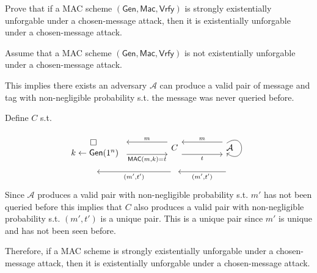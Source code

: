\documentclass[12pt, letterpaper]{article}
\newcommand{\skcgen}{{\sf Gen}}
\begin{document}
\begin{problem}{}
    Prove that if a MAC scheme $(\mathsf{Gen}, \mathsf{Mac}, \mathsf{Vrfy})$ is strongly existentially unforgable under a chosen-message attack, then it is existentially unforgable under a chosen-message attack.
\end{problem}
\begin{problemproof}
    Assume that a MAC scheme $(\mathsf{Gen}, \mathsf{Mac}, \mathsf{Vrfy})$ is not existentially unforgable under a chosen-message attack.

    This implies there exists an adversary $\mathcal{A}$ can produce a valid pair of message and tag with non-negligible probability s.t. the message was never queried before.

    Define $C$ s.t.
    \[\begin{tikzcd}
	\begin{array}{c} \square\\\ k \leftarrow \skcgen(1^n) \end{array} && C && {\mathcal{A}} \\
	{} && {} && {}
	\arrow["{\mathsf{MAC}(m,k)=t}"', shift right=3, from=1-1, to=1-3]
	\arrow["m"', shift right=3, from=1-3, to=1-1]
	\arrow["t"', shift right=3, from=1-3, to=1-5]
	\arrow["m"', shift right=3, from=1-5, to=1-3]
	\arrow[shift right=5, from=1-5, to=1-5, loop, in=325, out=35, distance=10mm]
	\arrow["{(m',t')}", shift right=3, from=2-3, to=2-1]
	\arrow["{(m',t')}", shift right=3, from=2-5, to=2-3]
\end{tikzcd}\]
   Since $\mathcal{A}$ produces a valid pair with non-negligible probability s.t. $m'$ has not been queried before this implies that $C$ also produces a valid pair with non-negligible probability s.t. $(m',t')$ is a unique pair.
   This is a unique pair since $m'$ is unique and has not been seen before.

   Therefore, if a MAC scheme is strongly existentially unforgable under a chosen-message attack, then it is existentially unforgable under a chosen-message attack.
\end{problemproof}
\end{document}
